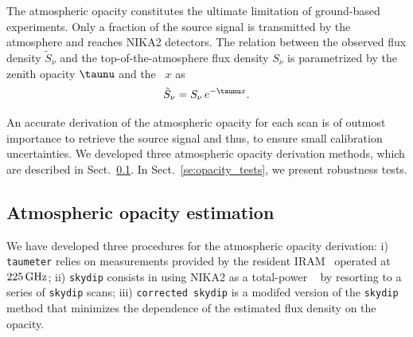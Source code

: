 
The atmospheric opacity constitutes the ultimate limitation of
ground-based experiments. Only a fraction of the source 
signal is transmitted by the atmosphere and reaches NIKA2 detectors. 
The relation between the observed flux density
$\tilde{S}_{\nu}$ and the top-of-the-atmosphere flux density $S_{\nu}$
is parametrized by the zenith opacity $\taunu$
and the \airmass\ $x$ as %
\begin{equation}
\tilde{S}_{\nu} = S_{\nu} \, e^{-\taunu  x}.
\label{eq:uncorr_flux}
\end{equation}

An accurate derivation of the atmospheric opacity for each scan is
of outmost importance to retrieve the source signal and thus, to
ensure small calibration uncertainties.
We developed three atmospheric opacity derivation methods, which are described in
Sect.~\ref{se:opacity_methods}. In Sect.~\ref{se:opacity_tests}, we
present robustness tests.

\subsection{Atmospheric opacity estimation}
\label{se:opacity_methods}

We have developed three procedures for the atmospheric opacity
derivation: i) {\tt taumeter} relies on measurements
provided by the resident IRAM \taumeter\ operated at $225\,\rm{GHz}$;
ii) {\tt skydip} consists in using NIKA2 as a total-power \taumeter\ 
by resorting to a series of {\tt skydip} scans;
iii) {\tt corrected skydip} is a modifed
version of the {\tt skydip} method that minimizes the dependence of the
estimated flux density on the opacity.

